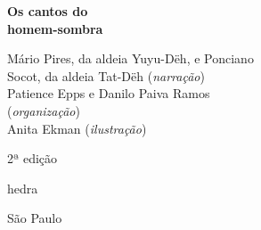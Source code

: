 




\begingroup\thispagestyle{empty}\vspace*{.05\textheight} 

              {\formular
              \huge
              \noindent
              \textbf{Os cantos do\\ 
              homem-sombra}\\
              
              \vspace{-0.5cm}
              
              }

              \vfill              

              {\small
              \noindent{}Mário Pires, da aldeia Yuyu-Dëh, e Ponciano\\ 
              Socot, da aldeia Tat-Dëh (\textit{narração})\vspace{0.2cm}\\
              \noindent{}Patience Epps e Danilo Paiva Ramos\\
              (\textit{organização})\vspace{0.2cm}\\
              \noindent{}Anita Ekman (\textit{ilustração})
              }

              \vspace{0.5cm}

              {\small\noindent{}2ª edição}

              \vfill
              
              \newfontfamily{}
              {\noindent\fontsize{30}{40}\selectfont \timesnewroman hedra}

              {\selectfont\small\noindent São Paulo \quad\the\year}

\endgroup
\pagebreak